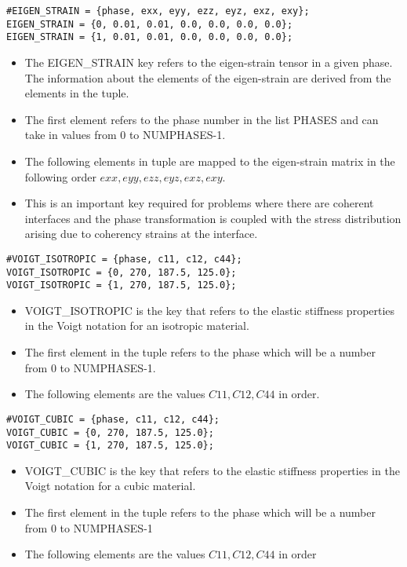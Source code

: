 \documentclass[a4paper,10pt]{article}
\begin{document}
\begin{lstlisting}
#EIGEN_STRAIN = {phase, exx, eyy, ezz, eyz, exz, exy};
EIGEN_STRAIN = {0, 0.01, 0.01, 0.0, 0.0, 0.0, 0.0};
EIGEN_STRAIN = {1, 0.01, 0.01, 0.0, 0.0, 0.0, 0.0};
\end{lstlisting}

\begin{itemize}
 \item The EIGEN\_STRAIN key refers to the eigen-strain tensor in a given phase. The information about the elements of the eigen-strain are derived from the elements in the tuple. 
 \item The first element refers to the phase number in the list PHASES and can take in values from 0 to NUMPHASES-1.
 \item The following elements in tuple are mapped to the eigen-strain matrix in the following order $exx, eyy, ezz, eyz, exz, exy$.
 \item This is an important key required for problems where there are coherent interfaces and the phase transformation is coupled with the stress distribution arising due to coherency strains at the interface.
\end{itemize}


\begin{lstlisting}
#VOIGT_ISOTROPIC = {phase, c11, c12, c44};
VOIGT_ISOTROPIC = {0, 270, 187.5, 125.0};
VOIGT_ISOTROPIC = {1, 270, 187.5, 125.0};
\end{lstlisting}

\begin{itemize}
 \item VOIGT\_ISOTROPIC is the key that refers to the elastic stiffness properties in the Voigt notation for an isotropic material. 
 \item The first element in the tuple refers to the phase which will be a number from 0 to NUMPHASES-1.
 \item The following elements are the values $C11,C12,C44$ in order.
\end{itemize}


\begin{lstlisting}
#VOIGT_CUBIC = {phase, c11, c12, c44};
VOIGT_CUBIC = {0, 270, 187.5, 125.0};
VOIGT_CUBIC = {1, 270, 187.5, 125.0};
\end{lstlisting}

\begin{itemize}
 \item VOIGT\_CUBIC is the key that refers to the elastic stiffness properties in the Voigt notation for a cubic material. 
 \item The first element in the tuple refers to the phase which will be a number from 0 to NUMPHASES-1
 \item The following elements are the values $C11,C12,C44$ in order
\end{itemize}
\end{document}
